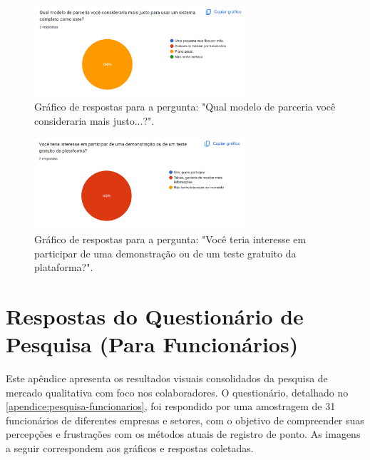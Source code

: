 \begin{apendicesenv}
\begin{figure}[h!]
  \centering
  \includegraphics[width=0.7\textwidth]{imagens/parceria.png}
  \caption{Gráfico de respostas para a pergunta: "Qual modelo de parceria você consideraria mais justo...?".}
  \label{fig:resp-gestor-modelo-parceria}
\end{figure}

\begin{figure}[h!]
  \centering
  \includegraphics[width=0.7\textwidth]{imagens/interesse-teste.png}
  \caption{Gráfico de respostas para a pergunta: "Você teria interesse em participar de uma demonstração ou de um teste gratuito da plataforma?".}
  \label{fig:resp-gestor-interesse-teste}
\end{figure}

\chapter{Respostas do Questionário de Pesquisa (Para Funcionários)}
\label{apendice:respostas-funcionarios}

Este apêndice apresenta os resultados visuais consolidados da pesquisa de mercado qualitativa com foco nos colaboradores. O questionário, detalhado no \autoref{apendice:pesquisa-funcionarios}, foi respondido por uma amostragem de 31 funcionários de diferentes empresas e setores, com o objetivo de compreender suas percepções e frustrações com os métodos atuais de registro de ponto. As imagens a seguir correspondem aos gráficos e respostas coletadas.


\end{apendicesenv}
